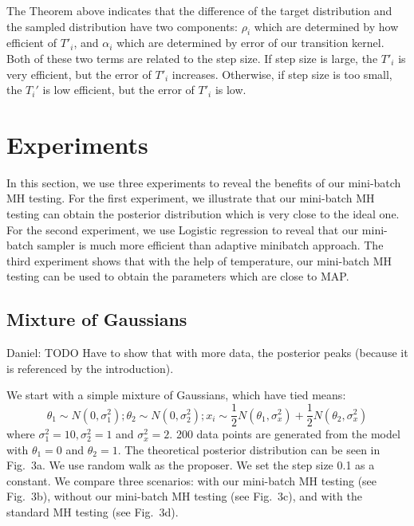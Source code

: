 \documentclass{article}
\begin{document}
The Theorem above indicates that the difference of the target distribution and the sampled distribution have two components: $\rho_i$ which are determined by how efficient of $T'_i$, and $\alpha_i$ which are determined by error of our transition kernel. Both of these two terms are related to the step size. If step size is large, the $T'_i$ is very efficient, but the error of $T'_i$ increases. Otherwise, if step size is too small, the $T_i'$ is low efficient, but the error of $T'_i$ is low.





\section{Experiments}\label{sec:experiments}

In this section, we use three experiments to reveal the benefits of our mini-batch MH testing. For
the first experiment, we illustrate that our mini-batch MH testing can obtain the posterior
distribution which is very close to the ideal one. For the second experiment, we use Logistic
regression to reveal that our mini-batch sampler is much more efficient than adaptive minibatch
approach. The third experiment shows that with the help of temperature, our mini-batch MH testing
can be used to obtain the parameters which are close to MAP. 

\subsection{Mixture of Gaussians}\label{ssec:gaussians}

{\color{blue}
Daniel: TODO Have to show that with more data, the posterior peaks (because it is referenced by the
introduction).
}

We start with a simple mixture of Gaussians, which have tied means:
\[
\theta_1 \sim N(0, \sigma_1^2); \theta_2 \sim N(0, \sigma_2^2); x_i \sim \frac{1}{2}N(\theta_1, \sigma_x^2) + \frac{1}{2} N(\theta_2, \sigma_x^2)
\]
where $\sigma_1^2 = 10, \sigma_2^2 = 1$ and $\sigma_x^2=2$. 200 data points are generated from the
model with $\theta_1 = 0$ and $\theta_2 = 1$. The theoretical posterior distribution can be seen in
Fig.~3a. We use random walk as the proposer. We set the step size 0.1 as a constant. We compare
three scenarios: with our mini-batch MH testing (see Fig.~3b), without our mini-batch MH testing
(see Fig.~3c), and with the standard MH testing (see Fig.~3d). 
\end{document}
